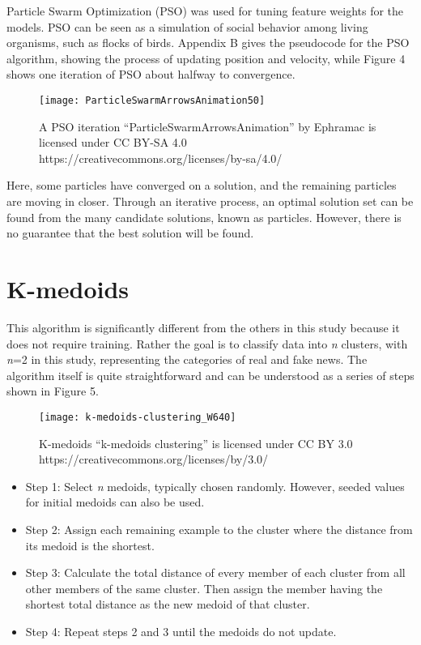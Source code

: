 \documentclass [11pt, proquest] {uwthesis}[2020/02/24]
\begin{document}
Particle Swarm Optimization (PSO) was used for tuning feature weights for the models. PSO can be seen as a simulation of social behavior among living organisms, such as flocks of birds. Appendix B gives the pseudocode for the PSO algorithm, showing the process of updating position and velocity, while Figure 4 shows one iteration of PSO about halfway to convergence. 
\begin{figure}[hbt!]
\begin{center}
\texttt{[image: ParticleSwarmArrowsAnimation50]}
\end{center}
\caption{A PSO iteration ``ParticleSwarmArrowsAnimation'' by Ephramac is licensed under CC BY-SA 4.0 https://creativecommons.org/licenses/by-sa/4.0/}
\end{figure}

Here, some particles have converged on a solution, and the remaining particles are moving in closer. Through an iterative process, an optimal solution set can be found from the many candidate solutions, known as particles. However, there is no guarantee that the best solution will be found. 

\section{K-medoids}
This algorithm is significantly different from the others in this study because it does not require training. Rather the goal is to classify data into \textit{n} clusters, with \textit{n}=2 in this study, representing the categories of real and fake news. The algorithm itself is quite straightforward and can be understood as a series of steps shown in Figure 5.

\begin{figure}[hbt!]
\begin{center}
\texttt{[image: k-medoids-clustering\_W640]}
\end{center}
\caption{K-medoids  ``k-medoids clustering'' is licensed under CC BY 3.0 https://creativecommons.org/licenses/by/3.0/}
\end{figure}
\begin{itemize} 
\item Step 1: Select \textit{n} medoids, typically chosen randomly. However, seeded values for initial medoids can also be used.
\item Step 2: Assign each remaining example to the cluster where the distance from its medoid is the shortest.
\item Step 3: Calculate the total distance of every member of each cluster from all other members of the same cluster. Then assign the member having the shortest total distance as the new medoid of that cluster.
\item Step 4: Repeat steps 2 and 3 until the medoids do not update.
\end{itemize}
\end{document}
